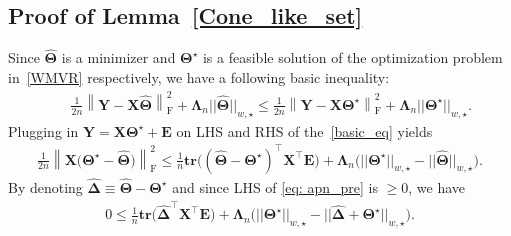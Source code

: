 \documentclass[12pt]{article}
\begin{document}
\subsection{Proof of Lemma~\ref{Cone_like_set}}
Since $\widehat{\boldsymbol{\Theta}}$ is a minimizer and $\boldsymbol{\Theta^{\star}}$ is a feasible solution of the optimization problem in~\eqref{WMVR} respectively, we have a following basic inequality:
\begin{eqnarray} \label{basic_eq}
    & & \frac{1}{2n} \left\| \boldsymbol{Y}-\boldsymbol{X}\boldsymbol{\widehat{\boldsymbol{\Theta}}} \right\|_{\text{F}}^{2} + \boldsymbol{\Lambda}_{n}||\widehat{\boldsymbol{\Theta}}||_{w,\star} \leq \frac{1}{2n}\left\| \boldsymbol{Y}-\boldsymbol{X}\boldsymbol{\Theta^{\star}} \right\|_{\text{F}}^{2} + \boldsymbol{\Lambda}_{n}||\boldsymbol{\Theta^{\star}}||_{w,\star}.
\end{eqnarray}
Plugging in $\boldsymbol{Y}=\boldsymbol{X}\boldsymbol{\Theta^{\star}}+\boldsymbol{E}$ on LHS and RHS of the~\eqref{basic_eq} yields
\begin{align}
    \frac{1}{2n} \left\| \boldsymbol{X} \big(\boldsymbol{\Theta^{\star}}-\boldsymbol{\widehat{\boldsymbol{\Theta}}}\big) \right\|_{\text{F}}^{2} \leq \frac{1}{n} \textbf{tr}\big( ( \boldsymbol{\widehat{\boldsymbol{\Theta}}} - \boldsymbol{\Theta^{\star}})^{\top} \boldsymbol{X}^{\top}\boldsymbol{E} \big) + 
    \boldsymbol{\Lambda}_{n} \big( ||\boldsymbol{\Theta^{\star}}||_{w,\star} - ||\widehat{\boldsymbol{\Theta}}||_{w,\star} \big). \label{eq: apn_pre}
\end{align}
By denoting $\boldsymbol{\widehat{\Delta}} \equiv \boldsymbol{ \widehat{\boldsymbol{\Theta}} } - \boldsymbol{ \boldsymbol{\Theta^{\star}} }$ and since LHS of \eqref{eq: apn_pre} is $\geq 0$, we have 
\begin{eqnarray}
    0 \leq \frac{1}{n} \textbf{tr}\big( \boldsymbol{\widehat{\Delta}}^{\top} \boldsymbol{X}^{\top}\boldsymbol{E} \big) + \boldsymbol{\Lambda}_{n}\big( ||\boldsymbol{\Theta^{\star}}||_{w,\star} - ||\boldsymbol{\widehat{\Delta}} + \boldsymbol{\Theta^{\star}}||_{w,\star} \big).  \label{eq: apn_main}
\end{eqnarray}
\end{document}
